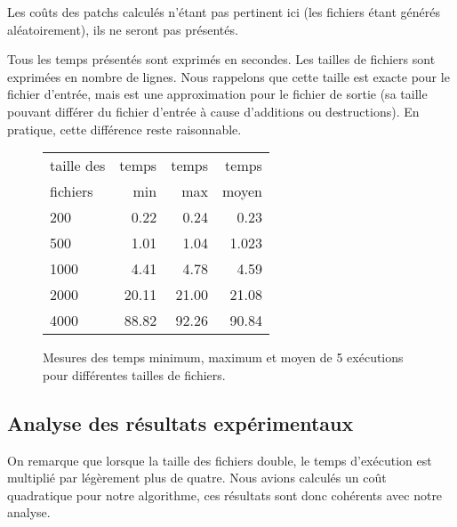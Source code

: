 \documentclass[a4paper, 10pt, french]{article}
\begin{document}
    Les coûts des patchs calculés n'étant pas pertinent ici (les fichiers étant
    générés aléatoirement), ils ne seront pas présentés.

    Tous les temps présentés sont exprimés en secondes. Les tailles de fichiers
    sont exprimées en nombre de lignes. Nous rappelons que cette taille est exacte
    pour le fichier d'entrée, mais est une approximation pour le fichier de sortie
    (sa taille pouvant différer du fichier d'entrée à cause d'additions ou destructions).
    En pratique, cette différence reste raisonnable.

    \begin{figure}[h]
      \begin{center}
        \begin{tabular}{|l||r|r|r||}
          \hline
          \hline
            taille des &   temps     & temps   & temps \\
            fichiers &   min       & max     & moyen \\
          \hline
          \hline
            200 &  0.22      &   0.24  &  0.23   \\
          \hline
            500 &  1.01      &   1.04  &  1.023   \\
          \hline
            1000 &   4.41     &  4.78   &  4.59   \\
          \hline
            2000 & 20.11   &  21.00   &  21.08   \\
          \hline
            4000 & 88.82  &    92.26   &  90.84  \\
          \hline
          \hline
        \end{tabular}
        \caption{Mesures des temps minimum, maximum et moyen de 5 exécutions pour différentes tailles de fichiers.}
        \label{table-temps}
      \end{center}
    \end{figure}

\subsection{Analyse des résultats expérimentaux}
On remarque que lorsque la taille des fichiers double, le temps d'exécution est
multiplié par légèrement plus de quatre. Nous avions calculés un coût quadratique
pour notre algorithme, ces résultats sont donc cohérents avec notre analyse.

\end{document}
